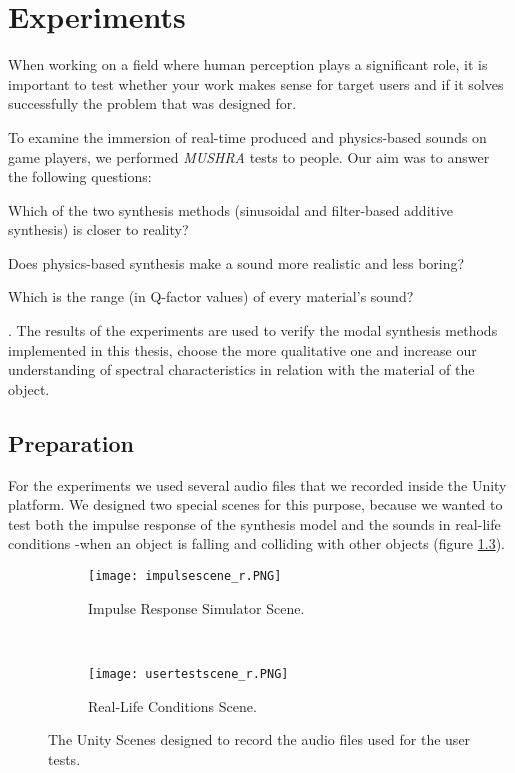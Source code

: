 \chapter{Experiments}\label{ch:tests}
\done{}

When working on a field where human perception plays a significant role, it is important to test whether your work makes sense for target users and if it solves successfully the problem that was designed for.

To examine the immersion of real-time produced and physics-based sounds on game players, we performed \textit{MUSHRA}\cite{series2014method} tests to people. Our aim was to answer the following questions: \begin{inparaenum}[1)]
\item Which of the two synthesis methods (sinusoidal and filter-based additive synthesis) is closer to reality? 
\item Does physics-based synthesis make a sound more realistic and less boring?
\item Which is the range (in Q-factor values) of every material's sound?
\end{inparaenum}.
The results of the experiments are used to verify the modal synthesis methods implemented in this thesis, choose the more qualitative one and increase our understanding of spectral characteristics in relation with the material of the object. 

\section{Preparation}
For the experiments we used several audio files that we recorded inside the Unity\textsuperscript{\textregistered} platform. We designed two special scenes for this purpose, because we wanted to test both the impulse response of the synthesis model and the sounds in real-life conditions -when an object is falling and colliding with other objects (figure \ref{fig:test_scenes}). 

\begin{figure}[H]
    \centering
    \begin{subfigure}[b]{0.45\textwidth}
        \texttt{[image: impulsescene\_r.PNG]}
        \caption{Impulse Response Simulator Scene.}
        \label{fig:test_sc1}
    \end{subfigure}
    ~ %
    \begin{subfigure}[b]{0.45\textwidth}
        \texttt{[image: usertestscene\_r.PNG]}
        \caption{Real-Life Conditions Scene.}
        \label{fig:test_sc2}
    \end{subfigure}
    \caption{The Unity\textsuperscript{\textregistered} Scenes designed to record the audio files used for the user tests.}\label{fig:test_scenes}
\end{figure}

